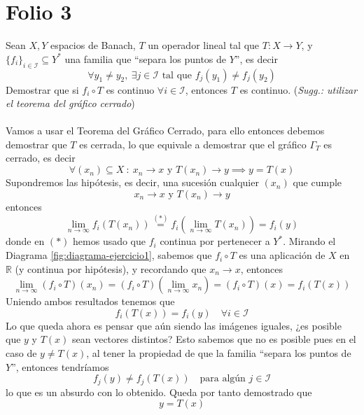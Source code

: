 
\section{Folio 3}

\begin{ejercicio}
    Sean $X,Y$ espacios de Banach, $T$ un operador lineal tal que $T: X \longrightarrow Y$, y $\{f_i\}_{i \in \mathcal{I}} \subseteq Y^*$ una familia que ``separa los puntos de $Y$'', es decir
    \begin{equation*}
        \forall y_1 \neq y_2, \ \exists j \in \mathcal{I} \text{ tal que } f_j(y_1) \neq f_j(y_2)
    \end{equation*}
    Demostrar que si $f_i \circ T$ es continuo $\forall i \in \mathcal{I}$, entonces $T$ es continuo. (\textit{Sugg.: utilizar el teorema del gráfico cerrado})\\ \\
    \noindent
    Vamos a usar el Teorema del Gráfico Cerrado, para ello entonces debemos demostrar que $T$ es cerrada, lo que equivale a demostrar que el gráfico $\Gamma_T$ es cerrado, es decir
    \begin{equation*}
        \forall (x_n) \subseteq X\ : \ x_n \longrightarrow x \text{ y } T(x_n) \longrightarrow y \implies y = T(x)
    \end{equation*}
    Supondremos las hipótesis, es decir, una sucesión cualquier $(x_n)$ que cumple
    \begin{equation*}
        x_n \longrightarrow x \text{ y } T(x_n) \longrightarrow y
    \end{equation*}
    entonces
    \begin{equation*}
        \lim_{n \to \infty} f_i(T(x_n)) \overset{(*)}{=} f_i\left(\lim_{n \to \infty} T(x_n)\right) = f_i(y)
    \end{equation*}
    donde en $(*)$ hemos usado que $f_i$ continua por pertenecer a $Y^*$. Mirando el Diagrama \ref{fig:diagrama-ejercicio1}, sabemos que $f_i \circ T$ es una aplicación de $X$ en $\mathbb{R}$ (y continua por hipótesis), y recordando que $x_n \longrightarrow x$, entonces
    $$\lim_{n \to \infty} (f_i \circ T)(x_n) = (f_i \circ T)(\lim_{n \to \infty} x_n) = (f_i\circ T)(x)=f_i(T(x))$$
    Uniendo ambos resultados tenemos que 
    \begin{equation*}
        f_i(T(x)) = f_i(y) \quad \forall i \in \mathcal{I}
    \end{equation*}
    Lo que queda ahora es pensar que aún siendo las imágenes iguales, ¿es posible que $y$ y $T(x)$ sean vectores distintos? Esto sabemos que no es posible pues en el caso de $y\neq T(x)$, al tener la propiedad de que la familia ``separa los puntos de $Y$'', entonces tendríamos 
    \begin{equation*}
        f_j(y) \neq f_j(T(x)) \quad \text{para algún } j \in \mathcal{I}
    \end{equation*}
    lo que es un absurdo con lo obtenido. Queda por tanto demostrado que
    \begin{equation*}
        y = T(x)
    \end{equation*}


\end{ejercicio}
